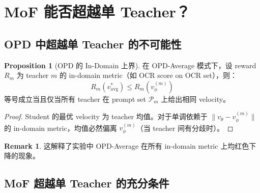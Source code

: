 \documentclass[11pt,a4paper]{article}
\newcommand{\vtheta}{v_\theta}
\newcommand{\vphi}{v_\phi}
\theoremstyle{definition}
\newtheorem{remark}{Remark}
\newtheorem{proposition}{Proposition}
\begin{document}
\section{MoF 能否超越单 Teacher？}
\label{sec:beyond_single}

\subsection{OPD 中超越单 Teacher 的不可能性}

\begin{proposition}[OPD 的 In-Domain 上界]
在 OPD-Average 模式下，设 reward $R_m$ 为 teacher $m$ 的 in-domain metric（如 OCR score on OCR set），则：
\begin{equation}
R_m\!\left(v^*_{\mathrm{avg}}\right) \leq R_m\!\left(\vphi^{(m)}\right)
\end{equation}
等号成立当且仅当所有 teacher 在 prompt set $\mathcal{P}_m$ 上给出相同 velocity。
\end{proposition}

\begin{proof}
Student 的最优 velocity 为 teacher 均值。对于单调依赖于 $\|\vtheta - \vphi^{(m)}\|$ 的 in-domain metric，均值必然偏离 $\vphi^{(m)}$（当 teacher 间有分歧时）。
\end{proof}

\begin{remark}
这解释了实验中 OPD-Average 在所有 in-domain metric 上均红色下降的现象。
\end{remark}

\subsection{MoF 超越单 Teacher 的充分条件}
\end{document}
